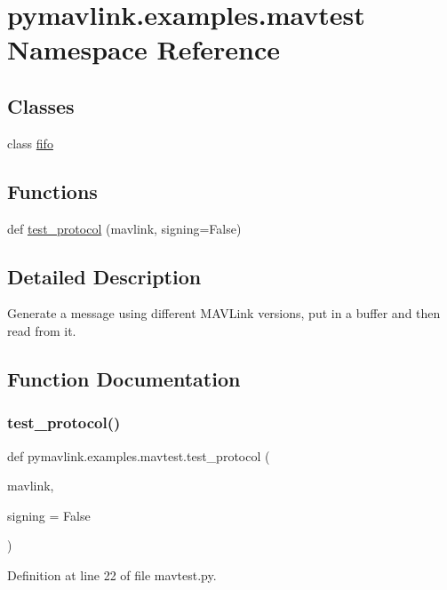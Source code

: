 \hypertarget{namespacepymavlink_1_1examples_1_1mavtest}{}\section{pymavlink.\+examples.\+mavtest Namespace Reference}
\label{namespacepymavlink_1_1examples_1_1mavtest}
\subsection*{Classes}
\begin{DoxyCompactItemize}
\item 
class \mbox{\hyperlink{classpymavlink_1_1examples_1_1mavtest_1_1fifo}{fifo}}
\end{DoxyCompactItemize}
\subsection*{Functions}
\begin{DoxyCompactItemize}
\item 
def \mbox{\hyperlink{namespacepymavlink_1_1examples_1_1mavtest_ab86e49832c4e9d8ba05cb982d7588bc6}{test\+\_\+protocol}} (mavlink, signing=False)
\end{DoxyCompactItemize}


\subsection{Detailed Description}
\begin{DoxyVerb}Generate a message using different MAVLink versions, put in a buffer and then read from it.
\end{DoxyVerb}
 

\subsection{Function Documentation}
\mbox{\label{namespacepymavlink_1_1examples_1_1mavtest_ab86e49832c4e9d8ba05cb982d7588bc6}} 
\subsubsection{\texorpdfstring{test\_protocol()}{test\_protocol()}}
{\footnotesize\ttfamily def pymavlink.\+examples.\+mavtest.\+test\+\_\+protocol (\begin{DoxyParamCaption}\item[{}]{mavlink,  }\item[{}]{signing = {\ttfamily False} }\end{DoxyParamCaption})}



Definition at line 22 of file mavtest.\+py.

